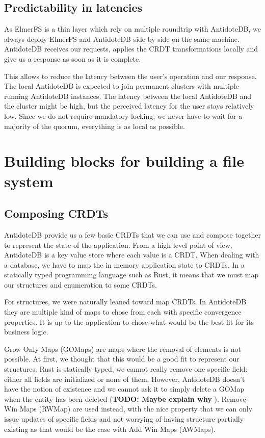 \documentclass[sigplan, 10pt]{acmart}
\begin{document}
\subsection{Predictability in latencies}

As ElmerFS is a thin layer which rely on multiple roundtrip with AntidoteDB,
we always deploy ElmerFS and AntidoteDB side by side on the same machine.
AntidoteDB receives our requests, applies the CRDT transformations
locally and give us a response as soon as it is complete.

This allows to reduce the latency between the user's operation and our response.
The local AntidoteDB is expected to join permanent clusters with multiple
running AntidoteDB instances. The latency between the local AntidoteDB and
the cluster might be high, but the perceived latency for the user stays
relatively low. Since we do not require mandatory locking, we never have to
wait for a majority of the quorum, everything is as local as possible.

\section{Building blocks for building a file system}

\subsection{Composing CRDTs}

AntidoteDB provide us a few basic CRDTs that we can use and compose together
to represent the state of the application. From a high level point of view,
AntidoteDB is a key value store where each value is a CRDT.
When dealing with a database, we have to map
the in memory application state to CRDTs.
In a statically typed programming language such as Rust, it means
that we must map our structures and enumeration to some CRDTs.

For structures, we were naturally leaned toward map CRDTs.
In AntidoteDB they are multiple kind of maps to chose from each with specific
convergence properties. It is up to the application to chose what would be the best fit
for its business logic.

Grow Only Maps (GOMaps) are maps where the removal of elements is not possible.
At first, we thought that this would be a good fit to represent
our structures. Rust is statically typed, we cannot really remove one specific
field: either all fields are initialized or none of them. However, AntidoteDB
doesn't have the notion of existence and we cannot ask it to simply delete
a GOMap when the entity has been deleted (\textbf{TODO: Maybe explain why }).
Remove Win Maps (RWMap) are used instead, with the nice property that
we can only issue updates of specific fields and not worrying of
having structure partially existing as that would be the case
with Add Win Maps (AWMaps).
\end{document}
